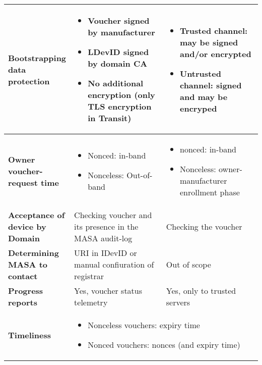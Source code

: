 \begin{longtable}{|p{0.23\linewidth}|p{0.372\linewidth}|p{0.393\linewidth}|}
		\hline
		\cellcolor[rgb]{ .745,  .804,  .843} \textbf{Bootstrapping data protection} &  
			\begin{itemize}[leftmargin=*, topsep=0pt, noitemsep]
			\item
			 Voucher signed by manufacturer
			\item
			 LDevID signed by domain CA
			\item
			 No additional encryption (only TLS encryption in Transit)
		\end{itemize}
		 	 & 
			\begin{itemize}[leftmargin=*, topsep=0pt, noitemsep]
			\item
			 Trusted channel: may be signed and/or encrypted
			\item
			 Untrusted channel: signed and may be encryped
		\end{itemize}
		  \\

		\hline
		\cellcolor[rgb]{ .745,  .804,  .843} \textbf{Owner voucher-request time} &  
		\begin{itemize}[leftmargin=*, topsep=0pt, noitemsep]
		\item
			Nonced: in-band
		\item
			Nonceless: Out-of-band
		\end{itemize}
		 &  
		\begin{itemize}[leftmargin=*, topsep=0pt, noitemsep]
		\item
			nonced: in-band
		\item
			Nonceless: owner-manufacturer enrollment phase
		\end{itemize}
	 \\

		\hline
		\cellcolor[rgb]{ .745,  .804,  .843} \textbf{Acceptance of device by Domain} &  Checking voucher and its presence in the MASA audit-log &  Checking the voucher \\

		\hline
		\cellcolor[rgb]{ .745,  .804,  .843} \textbf{Determining MASA to contact} &  URI in IDevID or manual confiuration of registrar &  Out of scope \\

		\hline
		\cellcolor[rgb]{ .745,  .804,  .843} \textbf{Progress reports} &  Yes, voucher status telemetry &  Yes, only to trusted servers \\

		\hline
		\cellcolor[rgb]{ .745,  .804,  .843} \textbf{Timeliness} & \multicolumn{2}{p{36.67em}|}{ 
		\begin{itemize}[leftmargin=*, topsep=0pt, noitemsep]
		\item
			Nonceless vouchers: expiry time
		\item
			Nonced vouchers: nonces (and expiry time)
		\end{itemize}
		} \\


\end{longtable}

